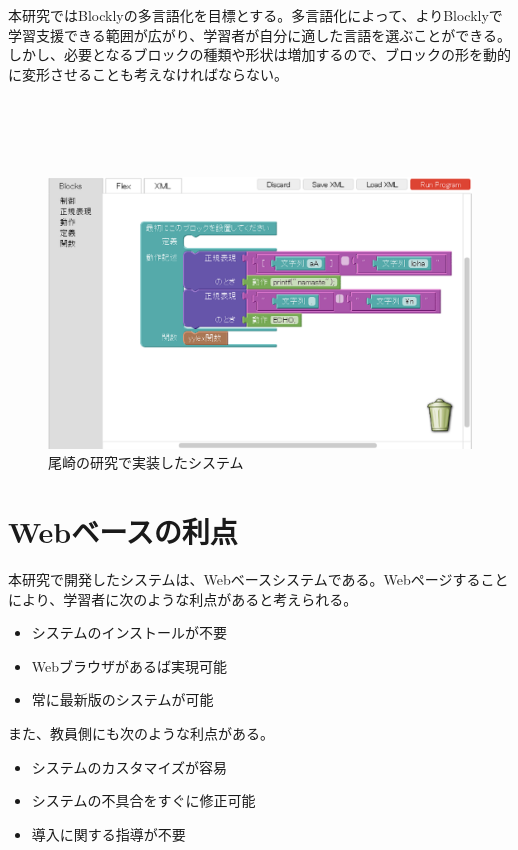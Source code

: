 \documentclass{eniepaper}
\begin{document}
本研究ではBlocklyの多言語化を目標とする。多言語化によって、よりBlocklyで学習支援できる範囲が広がり、学習者が自分に適した言語を選ぶことができる。しかし、必要となるブロックの種類や形状は増加するので、ブロックの形を動的に変形させることも考えなければならない。 
\\
\\
\\
\\
\\
\begin{figure}[h]
\begin{center}
\includegraphics[scale=0.3]{img/ozaki.eps}
\caption{尾崎の研究で実装したシステム}%
\label{fig:ozaki}
\end{center}%
\end{figure}%

\newpage

   \section{Webベースの利点}
   
本研究で開発したシステムは、Webベースシステムである。Webページすることにより、学習者に次のような利点があると考えられる。

\begin{itemize}
\item システムのインストールが不要
\item Webブラウザがあるば実現可能
\item 常に最新版のシステムが可能
\end{itemize} 

また、教員側にも次のような利点がある。

\begin{itemize}
\item システムのカスタマイズが容易
\item システムの不具合をすぐに修正可能
\item 導入に関する指導が不要
\end{itemize} 
\end{document}
